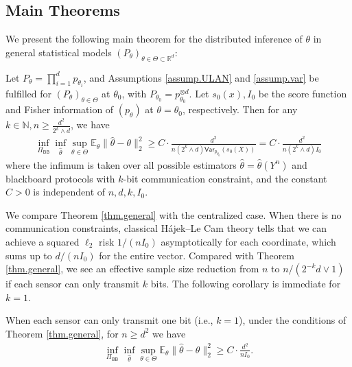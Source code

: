 \documentclass[final,12pt]{colt2018} %
\def \bE {\mathbb{E}}
\def \bR {\mathbb{R}}
\def \var {\mathsf{Var}}
\begin{document}
\subsection{Main Theorems}
We present the following main theorem for the distributed inference of $\theta$ in general statistical models $(P_\theta)_{\theta\in \Theta\subset \bR^d}$:
\begin{theorem}\label{thm.general}
	Let $P_{\theta}=\prod_{i=1}^d p_{\theta_i}$, and Assumptions \ref{assump.ULAN} and \ref{assump.var} be fulfilled for $(P_\theta)_{\theta\in\Theta}$ at $\theta_0$, with $P_{\theta_0}=p_{\theta_0}^{\otimes d}$. Let $s_0(x), I_0$ be the score function and Fisher information of $(p_\theta)$ at $\theta=\theta_0$, respectively. Then for any $k\in\mathbb{N}, n\ge \frac{d^2}{2^k\wedge d}$, we have
	\begin{align*}
	\inf_{\Pi_{\mathsf{BB}}} \inf_{\hat{\theta}}\sup_{\theta\in\Theta} \bE_{\theta}\|\hat{\theta}-\theta\|_2^2 \ge C\cdot \frac{d^2}{n(2^k\wedge d)\var_{p_{\theta_0}}(s_{0}(X))} =  C\cdot \frac{d^2}{n(2^k\wedge d)I_0}
	\end{align*}
	where the infimum is taken over all possible estimators $\hat{\theta}=\hat{\theta}(Y^n)$ and blackboard protocols with $k$-bit communication constraint, and the constant $C>0$ is independent of $n,d,k,I_0$. 
\end{theorem}

We compare Theorem \ref{thm.general} with the centralized case. When there is no communication constraints, classical H\'{a}jek--Le Cam theory \cite{Hajek1972local} tells that we can achieve a squared $\ell_2$ risk $1/(nI_0)$ asymptotically for each coordinate, which sums up to $d/(nI_0)$ for the entire vector. Compared with Theorem \ref{thm.general}, we see an effective sample size reduction from $n$ to $n/(2^{-k}d\vee 1)$ if each sensor can only transmit $k$ bits. The following corollary is immediate for $k=1$.
\begin{corollary}[General lower bound for $k=1$]\label{cor.k=1}
	When each sensor can only transmit one bit (i.e., $k=1$), under the conditions of Theorem \ref{thm.general}, for $n\ge d^2$ we have
	\begin{align*}
	\inf_{\Pi_{\mathsf{BB}}} \inf_{\hat{\theta}}\sup_{\theta\in\Theta} \bE_{\theta}\|\hat{\theta}-\theta\|_2^2 \ge C\cdot \frac{d^2}{nI_0}.
	\end{align*}
\end{corollary}
\end{document}
